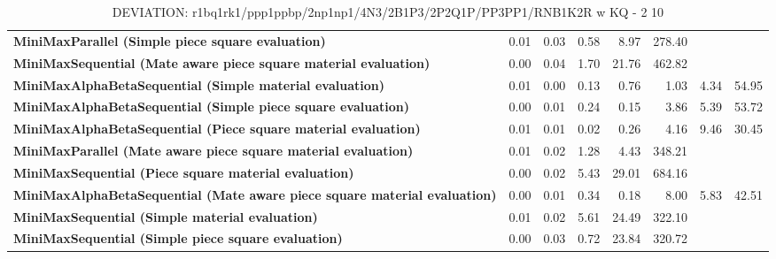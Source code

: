 \begin{table}[H]
{\begin{tabular}{|p{8cm}|*{7}{r|}}
\rowcolor[HTML]{FFFFFF}
\textbf{MiniMaxParallel (Simple piece square evaluation)}               & 0.01 & 0.03 & 0.58 & 8.97 & 278.40 &  &  \\

\rowcolor[HTML]{EFEFEF}
\textbf{MiniMaxSequential (Mate aware piece square material evaluation)}               & 0.00 & 0.04 & 1.70 & 21.76 & 462.82 &  &  \\

\rowcolor[HTML]{FFFFFF}
\textbf{MiniMaxAlphaBetaSequential (Simple material evaluation)}               & 0.01 & 0.00 & 0.13 & 0.76 & 1.03 & 4.34 & 54.95 \\

\rowcolor[HTML]{EFEFEF}
\textbf{MiniMaxAlphaBetaSequential (Simple piece square evaluation)}               & 0.00 & 0.01 & 0.24 & 0.15 & 3.86 & 5.39 & 53.72 \\

\rowcolor[HTML]{FFFFFF}
\textbf{MiniMaxAlphaBetaSequential (Piece square material evaluation)}               & 0.01 & 0.01 & 0.02 & 0.26 & 4.16 & 9.46 & 30.45 \\

\rowcolor[HTML]{EFEFEF}
\textbf{MiniMaxParallel (Mate aware piece square material evaluation)}               & 0.01 & 0.02 & 1.28 & 4.43 & 348.21 &  &  \\

\rowcolor[HTML]{FFFFFF}
\textbf{MiniMaxSequential (Piece square material evaluation)}               & 0.00 & 0.02 & 5.43 & 29.01 & 684.16 &  &  \\

\rowcolor[HTML]{EFEFEF}
\textbf{MiniMaxAlphaBetaSequential (Mate aware piece square material evaluation)}               & 0.00 & 0.01 & 0.34 & 0.18 & 8.00 & 5.83 & 42.51 \\

\rowcolor[HTML]{FFFFFF}
\textbf{MiniMaxSequential (Simple material evaluation)}               & 0.01 & 0.02 & 5.61 & 24.49 & 322.10 &  &  \\

\rowcolor[HTML]{EFEFEF}
\textbf{MiniMaxSequential (Simple piece square evaluation)}               & 0.00 & 0.03 & 0.72 & 23.84 & 320.72 &  &  \\

            \hline
        \end{tabular}%
    }
    \caption{DEVIATION: r1bq1rk1/ppp1ppbp/2np1np1/4N3/2B1P3/2P2Q1P/PP3PP1/RNB1K2R w KQ - 2 10}
    \label{tab:complex-tactical-middle-game-deviation}
\end{table}

